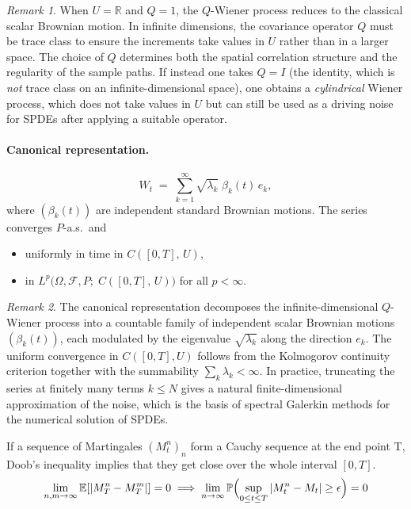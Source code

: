 \documentclass[11pt]{article}
\theoremstyle{definition}
\theoremstyle{remark}
\newtheorem{remark}{Remark}
\begin{document}
\begin{remark}
When $U = \mathbb{R}$ and $Q = 1$, the $Q$-Wiener process reduces to the classical scalar Brownian motion.  In infinite dimensions, the covariance operator $Q$ must be trace class to ensure the increments take values in $U$ rather than in a larger space.  The choice of $Q$ determines both the spatial correlation structure and the regularity of the sample paths.  If instead one takes $Q = I$ (the identity, which is \emph{not} trace class on an infinite-dimensional space), one obtains a \emph{cylindrical} Wiener process, which does not take values in $U$ but can still be used as a driving noise for SPDEs after applying a suitable operator.
\end{remark}

\paragraph{Canonical representation.}
\[
    W_t \;=\; \sum_{k=1}^{\infty} \sqrt{\lambda_k}\;\beta_k(t)\,e_k,
\]
where $(\beta_k(t))$ are independent standard Brownian motions.
The series converges $P$-a.s.\ and
\begin{itemize}
    \item uniformly in time in $C([0,T],\,U)$,
    \item in $L^p\!\bigl(\Omega, \mathcal{F}, P;\;
          C([0,T],\,U)\bigr)$ for all $p < \infty$.
\end{itemize}

\begin{remark}
The canonical representation decomposes the infinite-dimensional $Q$-Wiener process into a countable family of independent scalar Brownian motions $(\beta_k(t))$, each modulated by the eigenvalue $\sqrt{\lambda_k}$ along the direction $e_k$.  The uniform convergence in $C([0,T], U)$ follows from the Kolmogorov continuity criterion together with the summability $\sum_k \lambda_k < \infty$.  In practice, truncating the series at finitely many terms $k \le N$ gives a natural finite-dimensional approximation of the noise, which is the basis of spectral Galerkin methods for the numerical solution of SPDEs.
\end{remark}

If a sequence of Martingales $(M_t^n)_n$ form a Cauchy sequence at the end point T, Doob's inequality implies that they get close over the whole interval $[0,T]$.
\[
\lim_{ n, m \to \infty } \mathbb{E}[ \vert M_{T}^{n}- M_{T}^{m} \vert] = 0 \implies \lim_{  n \to \infty } \mathbb{P}\Bigl(\sup_{0\le t \le T}|M_{t}^{n}- M_{t}| \ge \epsilon\Bigr) =0
\]
\end{document}

